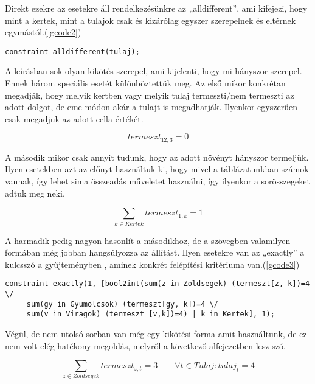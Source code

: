 \documentclass[12pt,a4paper]{report}
\begin{document}
    Direkt ezekre az esetekre áll rendelkezésünkre az „alldifferent”, ami kifejezi, hogy mint a kertek, mint a tulajok csak és kizárólag egyszer szerepelnek és eltérnek egymástól.(\ref{gcode2})
    
    \begin{lstlisting}[caption="Alldifferent" parancs, label=gcode2]
    constraint alldifferent(tulaj); \end{lstlisting}

    A leírásban sok olyan kikötés szerepel, ami kijelenti, hogy mi hányszor szerepel.
    Ennek három speciális esetét különböztettük meg.
    Az első mikor konkrétan megadják, hogy melyik kertben vagy melyik tulaj termeszti/nem termeszti az adott dolgot, de eme módon akár a tulajt is megadhatják.
    Ilyenkor egyszerűen csak megadjuk az adott cella értékét.

    \begin{equation}
    termeszt_{12,3}=0 
    \end{equation}

    A második mikor csak annyit tudunk, hogy az adott növényt hányszor termeljük.
    Ilyen esetekben azt az előnyt használtuk ki, hogy mivel a táblázatunkban számok vannak, így lehet sima összeadás műveletet használni, így ilyenkor a sorösszegeket adtuk meg neki.
    
	\begin{equation}
    \sum_{k\in Kertek} termeszt_{1,k} =1 
    \end{equation}

    A harmadik pedig nagyon hasonlít a másodikhoz, de a szövegben valamilyen formában még jobban hangsúlyozza az állítást.
    Ilyen esetekre van az „exactly” a kulcsszó a gyűjteményben , aminek konkrét felépítési kritériuma van.(\ref{gcode3})

    \begin{lstlisting}[caption="Exactly" használata, label=gcode3]
    constraint exactly(1, [bool2int(sum(z in Zoldsegek) (termeszt[z, k])=4 \/ 
     sum(gy in Gyumolcsok) (termeszt[gy, k])=4 \/ 
     sum(v in Viragok) (termeszt [v,k])=4) | k in Kertek], 1); \end{lstlisting}

    Végül, de nem utolsó sorban van még egy kikötési forma amit használtunk, de ez nem volt elég hatékony megoldás, melyről a következő alfejezetben lesz szó.

    \begin{equation}
        \sum_{z\in Zoldsegek} termeszt_{z,t} = 3 \qquad \forall t\in Tulaj: tulaj_{t} = 4
    \end{equation}
    
\end{document}

